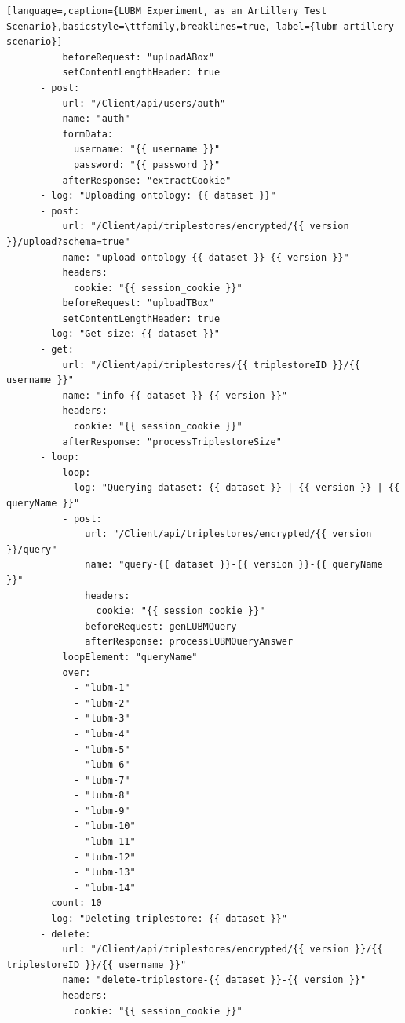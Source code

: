 \begin{lstlisting}[language=,caption={LUBM Experiment, as an Artillery Test Scenario},basicstyle=\ttfamily,breaklines=true, label={lubm-artillery-scenario}]
          beforeRequest: "uploadABox"
          setContentLengthHeader: true
      - post:                          
          url: "/Client/api/users/auth"
          name: "auth"
          formData:
            username: "{{ username }}"
            password: "{{ password }}"
          afterResponse: "extractCookie"
      - log: "Uploading ontology: {{ dataset }}"
      - post:                          
          url: "/Client/api/triplestores/encrypted/{{ version }}/upload?schema=true"
          name: "upload-ontology-{{ dataset }}-{{ version }}"
          headers:
            cookie: "{{ session_cookie }}"
          beforeRequest: "uploadTBox"
          setContentLengthHeader: true
      - log: "Get size: {{ dataset }}"
      - get:                          
          url: "/Client/api/triplestores/{{ triplestoreID }}/{{ username }}"
          name: "info-{{ dataset }}-{{ version }}"
          headers:
            cookie: "{{ session_cookie }}"
          afterResponse: "processTriplestoreSize"
      - loop:
        - loop:
          - log: "Querying dataset: {{ dataset }} | {{ version }} | {{ queryName }}"
          - post: 
              url: "/Client/api/triplestores/encrypted/{{ version }}/query"
              name: "query-{{ dataset }}-{{ version }}-{{ queryName }}"
              headers:
                cookie: "{{ session_cookie }}"
              beforeRequest: genLUBMQuery
              afterResponse: processLUBMQueryAnswer
          loopElement: "queryName" 
          over:
            - "lubm-1"
            - "lubm-2"
            - "lubm-3"
            - "lubm-4"
            - "lubm-5"
            - "lubm-6"
            - "lubm-7"
            - "lubm-8"
            - "lubm-9"
            - "lubm-10"
            - "lubm-11"
            - "lubm-12"      
            - "lubm-13"
            - "lubm-14"          
        count: 10
      - log: "Deleting triplestore: {{ dataset }}"
      - delete:                          
          url: "/Client/api/triplestores/encrypted/{{ version }}/{{ triplestoreID }}/{{ username }}"
          name: "delete-triplestore-{{ dataset }}-{{ version }}"
          headers:
            cookie: "{{ session_cookie }}"
\end{lstlisting}


